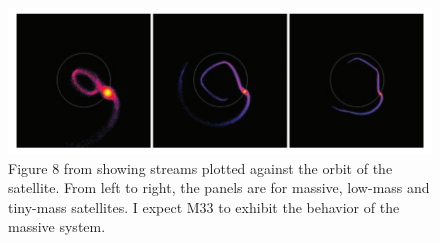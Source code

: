 \documentclass{aastex62}
\begin{document}
\begin{figure}[htp]
    \centering
    \includegraphics[width=13cm]{choi_fig8.png}
    \caption{Figure 8 from \cite{10.1111/j.1365-2966.2007.12313.x} showing streams plotted against the orbit of the satellite. From left to right, the panels are for massive, low-mass and tiny-mass satellites. I expect M33 to exhibit the behavior of the massive system.}
    \label{fig:galaxy}
\end{figure}

{}

\end{document}
